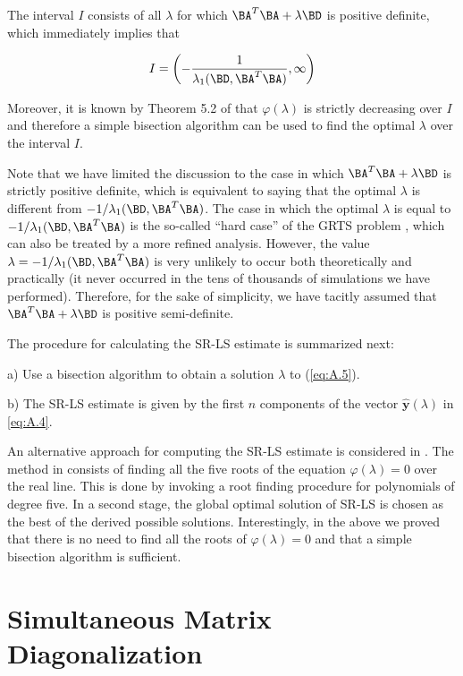 The interval $I$ consists of all $\lambda$ for which 
$\BA^{T}\BA + \lambda\BD$ is positive definite, which immediately implies
that 

\begin{equation} \label{eq:A.7}
I = \left(-\dfrac{1}{\lambda_1(\BD,\BA^{T}\BA)}, \infty\right)
\end{equation}

Moreover, it is known by Theorem 5.2 of \cite{More} that
$\varphi(\lambda)$ is strictly decreasing over $I$ and therefore
a simple bisection algorithm can be used to find the optimal $\lambda$
over the interval $I$.

Note that we have limited the discussion to the case in which 
$\BA^{T}\BA + \lambda\BD$ is strictly positive definite, which is
equivalent to saying that the optimal $\lambda$ is different from
$-1/\lambda_1(\BD, \BA^{T}\BA)$. The case in which the optimal $\lambda$
is equal to $-1/\lambda_1(\BD, \BA^{T}\BA)$ is the so-called
``hard case'' of the GRTS problem \cite{FortinWol}, which can 
also be treated by a more refined analysis. However, the value 
$\lambda = -1/\lambda_1(\BD, \BA^{T}\BA)$ 
is very unlikely to occur both theoretically and practically
(it never occurred in the tens of thousands of simulations we 
have performed). Therefore, for the sake of simplicity, we have
tacitly assumed that $\BA^{T}\BA + \lambda\BD$
is positive semi-definite.

The procedure for calculating the SR-LS estimate is summarized next:

a) Use a bisection algorithm to obtain a solution $\lambda$ to (\ref{eq:A.5}).

b) The SR-LS estimate is given by the first $n$ components of the 
vector $\hat{\mathbf{y}}(\lambda)$ in \ref{eq:A.4}.

An alternative approach for computing the SR-LS estimate is considered
in \cite{CheungChan}. The method in \cite{CheungChan} consists of 
finding all the five roots
of the equation $\varphi(\lambda) = 0$ over the real line. This is done
by invoking a root finding procedure for polynomials of degree five.
In a second stage, the global optimal solution of SR-LS is chosen as
the best of the derived possible solutions. Interestingly, in the
above we proved that there is no need to find all the roots of
$\varphi(\lambda) = 0$ and that a simple bisection algorithm is 
sufficient.

\section{Simultaneous Matrix Diagonalization}

